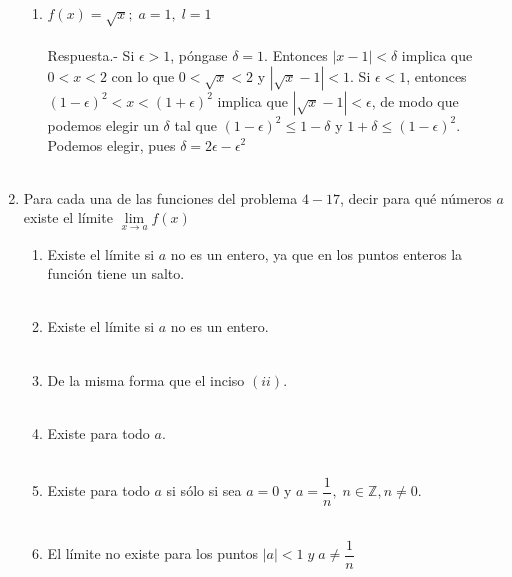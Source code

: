 \begin{enumerate}
\begin{enumerate}[\bfseries (i)]
    \item $f(x)=\sqrt{x};\; a=1,\; l=1$\\\\
	Respuesta.-\; Si $\epsilon > 1$,  póngase $\delta = 1$. Entonces $|x-1|<\delta$ implica que $0<x<2$ con lo que $0<\sqrt{x}<2$ y $|\sqrt{x}-1|<1$. Si $\epsilon < 1$, entonces $(1-\epsilon)^2<x<(1+\epsilon)^2$ implica que $|\sqrt{x}-1|<\epsilon$, de modo que podemos elegir  un $\delta$ tal que $(1-\epsilon)^2 \leq 1 - \delta$ y $1+\delta\leq (1-\epsilon)^2$. Podemos elegir, pues $\delta = 2\epsilon - \epsilon^2$\\\\

\end{enumerate}

\item Para cada una de las funciones del problema $4-17$, decir para qué números $a$ existe el límite $\lim\limits_{x\to a}f(x)$

\begin{enumerate}[\bfseries (i)]
    
    \item Existe el límite si $a$ no es un entero, ya que en los puntos enteros la función tiene un salto.\\\\
    
    \item Existe el límite si $a$ no es un entero.\\\\
    
    \item De la misma forma que el inciso $(ii)$.\\\\
    
    \item Existe para todo $a$.\\\\
    
    \item Existe para todo $a$ si sólo si sea $a=0$ y $a=\dfrac{1}{n}, \; n \in \mathbb{Z}, n\neq 0$.\\\\
    
    \item El límite no existe para los puntos $|a| < 1 \; y \; a\neq \dfrac{1}{n}$\\\\


\end{enumerate}
\end{enumerate}
